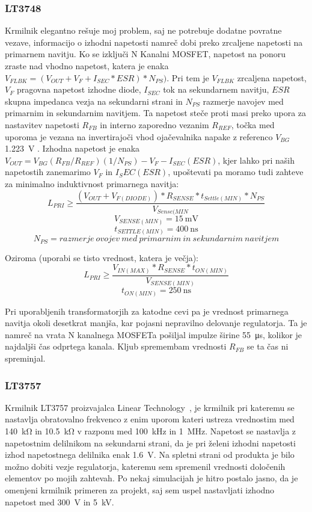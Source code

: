 \documentclass[a4paper,twoside,openright,12pt,Slovene]{book}
\begin{document}
	\subsubsection{LT3748} \label{LT3748}
Krmilnik elegantno rešuje moj problem, saj ne potrebuje dodatne povratne vezave, informacijo o izhodni napetosti namreč dobi preko zrcaljene napetosti na primarnem navitju. Ko se izključi N Kanalni MOSFET, napetost na ponoru zraste nad vhodno napetost, katera je enaka \(V_{FLBK} = (V_{OUT} + V_F + I_{SEC} * ESR) * N_{PS}) \). Pri tem je \(V_{FLBK}\) zrcaljena napetost, \(V_F\) pragovna napetost izhodne diode, \(I_{SEC}\) tok na sekundarnem navitju, \(ESR\) skupna impedanca vezja na sekundarni strani in \(N_{PS}\) razmerje navojev med primarnim in sekundarnim navitjem. Ta napetost steče proti masi preko upora za nastavitev napetosti \(R_{FB}\) in interno zaporedno vezanim \(R_{REF}\), točka med uporoma je vezana na invertirajoči vhod ojačevalnika napake z referenco \(V_{BG}\) \SI{1.223}{\volt} \cite{analog:LT3748}. Izhodna napetost je enaka \(V_{OUT} = V_{BG}(R_{FB} / R_{REF})(1 / N_{PS}) - V_F - I_{SEC} (ESR)\), kjer lahko pri naših napetostih zanemarimo \(V_F\) in \(I_SEC (ESR)\), upoštevati pa moramo tudi zahteve za minimalno induktivnost primarnega navitja:
\[L_{PRI} \geq \frac{(V_{OUT}+V_{F(DIODE)}) * R_{SENSE} * t_{Settle(MIN)} * N_{PS}}{V_{Sense(MIN}}\]
\[V_{SENSE(MIN)}=\SI{15}{\milli\volt}\]
\[t_{SETTLE(MIN)}=\SI{400}{\nano\second}\]
\[N_{PS}=razmerje \: ovojev \: med \: primarnim \: in \: sekundarnim \: navitjem \]

Oziroma (uporabi se tisto vrednost, katera je večja):
\[L_{PRI} \geq \frac{V_{IN(MAX)}*R_{SENSE}*t_{ON(MIN)}}{V_{SENSE(MIN)}}\]
\[t_{ON(MIN)}=\SI{250}{\nano\second}\]

Pri uporabljenih transformatorjih za katodne cevi pa je vrednost primarnega navitja okoli desetkrat manjša, kar pojasni nepravilno delovanje regulatorja. Ta je namreč na vrata N kanalnega MOSFETa pošiljal impulze širine \SI{55}{\micro\second}, kolikor je najdaljši čas odprtega kanala. Kljub spremembam vrednosti \(R_{FB}\) se ta čas ni spreminjal.

	\subsubsection{LT3757} \label{LT3757}
Krmilnik LT3757 proizvajalca Linear Technology~\cite{analog:LT3757}, je krmilnik pri kateremu se nastavlja obratovalno frekvenco z enim uporom kateri ustreza vrednostim med \SI{140}{\kilo\ohm} in \SI{10.5}{\kilo\ohm} v razponu med \SI{100} {\kilo\hertz} in \SI{1} {\mega\hertz}. Napetost se nastavlja z napetostnim delilnikom na sekundarni strani, da je pri želeni izhodni napetosti izhod napetostnega delilnika enak \SI{1.6} {\volt}. Na spletni strani od produkta je bilo možno dobiti vezje regulatorja, kateremu sem spremenil vrednosti določenih elementov po mojih zahtevah. Po nekaj simulacijah je hitro postalo jasno, da je omenjeni krmilnik primeren za projekt, saj sem uspel nastavljati izhodno napetost med \SI{300}{\volt} in \SI{5}{\kilo\volt}. 
\end{document}

